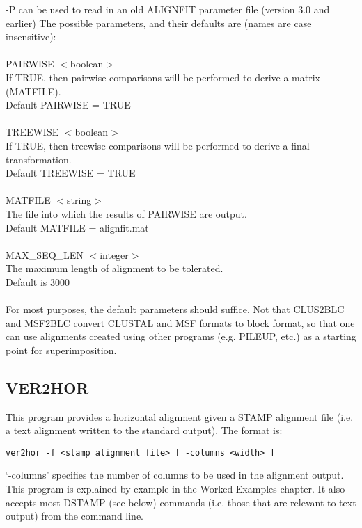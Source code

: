 -P can be used to read in an old ALIGNFIT parameter file (version 3.0 and earlier)
The possible parameters, and their defaults are (names are case 
insensitive):\\
\\
PAIRWISE $<$boolean$>$\\
If TRUE, then pairwise comparisons will be performed to derive a
matrix (MATFILE).\\
Default PAIRWISE = TRUE\\
\\
TREEWISE $<$boolean$>$\\
If TRUE, then treewise comparisons will be performed to derive a
final transformation.\\
Default TREEWISE = TRUE\\
\\
MATFILE $<$string$>$\\
The file into which the results of PAIRWISE are output.\\
Default MATFILE = alignfit.mat\\
\\
MAX\_SEQ\_LEN $<$integer$>$\\
The maximum length of alignment to be tolerated.\\
Default is 3000\\
\\
For most purposes, the default parameters should suffice.  Not that CLUS2BLC and MSF2BLC
convert CLUSTAL and MSF formats to block format, so that one can use alignments created
using other programs (e.g. PILEUP, etc.) as a starting point for superimposition.


\subsection{VER2HOR}

This program provides a horizontal alignment given a STAMP alignment file
(i.e. a text alignment written to the standard output).  The format is:

\begin{scriptsize}\begin{verbatim}
ver2hor -f <stamp alignment file> [ -columns <width> ]
\end{verbatim} \end{scriptsize}

`-columns' specifies the number of columns to be used in the alignment output.  This
program is explained by example in the Worked Examples chapter.  It also accepts 
most DSTAMP (see below) commands (i.e. those that are relevant to text output) from
the command line.


